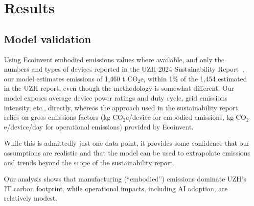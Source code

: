 \documentclass[11pt]{article}
\newcommand{\coe}{CO$_2$e}
\newcommand{\gcoe}{g \coe}
\newcommand{\kgcoe}{k\gcoe}
\begin{document}
\section{Results}
\label{sec:results}

\subsection{Model validation}

Using Ecoinvent embodied emissions values where available, and only the numbers and types of devices reported in the UZH 2024 Sustainability Report~\cite{uzh:sustainability:report}, our model estimates emissions of 1,460 t \coe, within 1\% of the 1,454 estimated in the UZH report, even though the methodology is somewhat different. Our model exposes average device power ratings and duty cycle, grid emissions intensity, etc., directly, whereas the approach used in the sustainability report relies on gross emissions factors (\kgcoe/device for embodied emissions, \kgcoe/device/day for operational emissions) provided by Ecoinvent.

While this is admittedly just one data point, it provides some confidence that our assumptions are realistic and that the model can be used to extrapolate emissions and trends beyond the scope of the sustainability report.

Our analysis shows that manufacturing (“embodied”) emissions dominate UZH's IT carbon footprint, while operational impacts, including AI adoption, are relatively modest.
\end{document}
